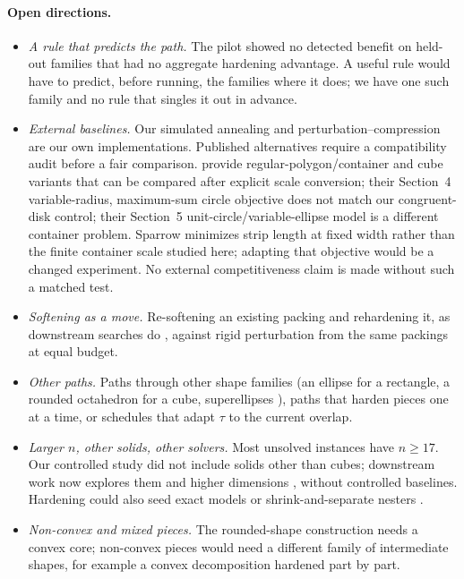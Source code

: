 \paragraph{Open directions.}
\begin{itemize}\itemsep1pt
\item \emph{A rule that predicts the path.} The pilot showed no detected benefit on held-out families that had no aggregate hardening advantage. A useful rule would have to predict, before running, the families where it does; we have one such family and no rule that singles it out in advance.
\item \emph{External baselines.} Our simulated annealing and perturbation--compression are our own implementations. Published alternatives require a compatibility audit before a fair comparison. \citet{Berthold2026} provide regular-polygon/container and cube variants that can be compared after explicit scale conversion; their Section~4 variable-radius, maximum-sum circle objective does not match our congruent-disk control; their Section~5 unit-circle/variable-ellipse model is a different container problem. Sparrow \citep{Gardeyn2025} minimizes strip length at fixed width rather than the finite container scale studied here; adapting that objective would be a changed experiment. No external competitiveness claim is made without such a matched test.
\item \emph{Softening as a move.} Re-softening an existing packing and rehardening it, as downstream searches do \citep{n13repo,platonicrepo}, against rigid perturbation from the same packings at equal budget.
\item \emph{Other paths.} Paths through other shape families (an ellipse for a rectangle, a rounded octahedron for a cube, superellipses \citep{Jiao2008}), paths that harden pieces one at a time, or schedules that adapt $\tau$ to the current overlap.
\item \emph{Larger $n$, other solids, other solvers.} Most unsolved instances have $n\ge17$. Our controlled study did not include solids other than cubes; downstream work now explores them \citep{platonicrepo} and higher dimensions \citep{tesseractrepo}, without controlled baselines. Hardening could also seed exact models \citep{Berthold2026} or shrink-and-separate nesters \citep{Gardeyn2025}.
\item \emph{Non-convex and mixed pieces.} The rounded-shape construction needs a convex core; non-convex pieces would need a different family of intermediate shapes, for example a convex decomposition hardened part by part.
\end{itemize}
